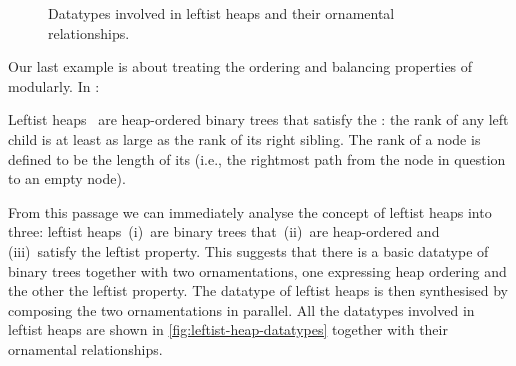 \begin{figure}
\begin{center}
\end{center}
\caption{Datatypes involved in leftist heaps and their ornamental relationships.}
\label{fig:leftist-heap-datatypes}
\end{figure}

Our last example is about treating the ordering and balancing properties of  modularly.
In :
\begin{quoting}\relax
Leftist heaps \omission\ are heap-ordered binary trees that satisfy the : the rank of any left child is at least as large as the rank of its right sibling. The rank of a node is defined to be the length of its  (i.e., the rightmost path from the node in question to an empty node).
\end{quoting}
From this passage we can immediately analyse the concept of leftist heaps into three: leftist heaps \,(i)~are binary trees that \,(ii)~are heap-ordered and \,(iii)~satisfy the leftist property.
This suggests that there is a basic datatype of binary trees together with two ornamentations, one expressing heap ordering and the other the leftist property.
The datatype of leftist heaps is then synthesised by composing the two ornamentations in parallel.
All the datatypes involved in leftist heaps are shown in \autoref{fig:leftist-heap-datatypes} together with their ornamental relationships.

